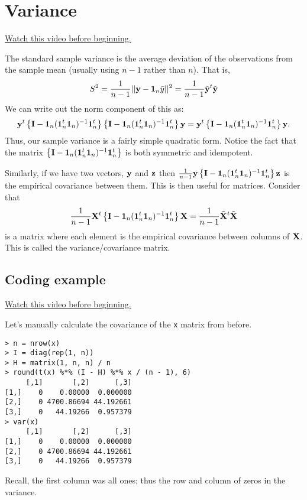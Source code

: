 \section{Variance}

\href{https://www.youtube.com/watch?v=hTVkDOojbdw&index=5&list=PLpl-gQkQivXhdgUCdaUQcdb31CRe8Mm2y}{Watch this video before beginning.}


The standard sample variance is the average deviation of the
observations from the sample mean (usually using $n-1$ rather than $n$). That is,
$$
S^2 = \frac{1}{n-1}|| \mathbf{y} -  \mathbf{1}_n \bar y||^2 = \frac{1}{n-1} \tilde {\mathbf{y}}^t \tilde {\mathbf{y}}
$$
We can write out the norm component of this as: 
$$
\mathbf{y}^t \left\{ \mathbf{I} - \mathbf{1}_n (\mathbf{1}_n^t \mathbf{1}_n)^{-1} \mathbf{1}_n^t \right\}
\left\{ \mathbf{I} - \mathbf{1}_n (\mathbf{1}_n^t \mathbf{1}_n)^{-1} \mathbf{1}_n^t \right\} \mathbf{y}
= \mathbf{y}^t \left\{ \mathbf{I} - \mathbf{1}_n (\mathbf{1}_n^t \mathbf{1}_n)^{-1} \mathbf{1}_n^t \right\}\mathbf{y}.
$$
Thus, our sample variance is a fairly simple quadratic form. 
Notice the fact that the matrix $\left\{ \mathbf{I} - \mathbf{1}_n (\mathbf{1}_n^t \mathbf{1}_n)^{-1} \mathbf{1}_n^t \right\}$
is both symmetric and idempotent.

Similarly, if we have two vectors, $\mathbf{y}$ and $\mathbf{z}$ then $\frac{1}{n-1}\mathbf{y} \left\{ \mathbf{I} - \mathbf{1}_n (\mathbf{1}_n^t \mathbf{1}_n)^{-1} \mathbf{1}_n^t \right\} \mathbf{z}$ is the
empirical covariance between them.
This is then useful for matrices. Consider that
$$
\frac{1}{n-1} \mathbf{X}^t \left\{ \mathbf{I} - \mathbf{1}_n (\mathbf{1}_n^t \mathbf{1}_n)^{-1} \mathbf{1}_n^t \right\} \mathbf{X}
= \frac{1}{n-1} \tilde {\mathbf{X}}^t \tilde {\mathbf{X}}
$$
is a matrix where each element is the empirical covariance between columns of $\mathbf{X}$.
This is called the variance/covariance matrix. 

\subsection{Coding example}

\href{https://www.youtube.com/watch?v=_AHZIy8PRmU&list=PLpl-gQkQivXhdgUCdaUQcdb31CRe8Mm2y&index=6}{Watch this video before beginning.}

Let's manually calculate the covariance of the \texttt{x} matrix from before.

\begin{verbatim}
> n = nrow(x)
> I = diag(rep(1, n))
> H = matrix(1, n, n) / n
> round(t(x) %*% (I - H) %*% x / (n - 1), 6)
     [,1]       [,2]      [,3]
[1,]    0    0.00000  0.000000
[2,]    0 4700.86694 44.192661
[3,]    0   44.19266  0.957379
> var(x)
     [,1]       [,2]      [,3]
[1,]    0    0.00000  0.000000
[2,]    0 4700.86694 44.192661
[3,]    0   44.19266  0.957379
\end{verbatim}
Recall, the first column was all ones; thus the row and column of zeros in the variance.





